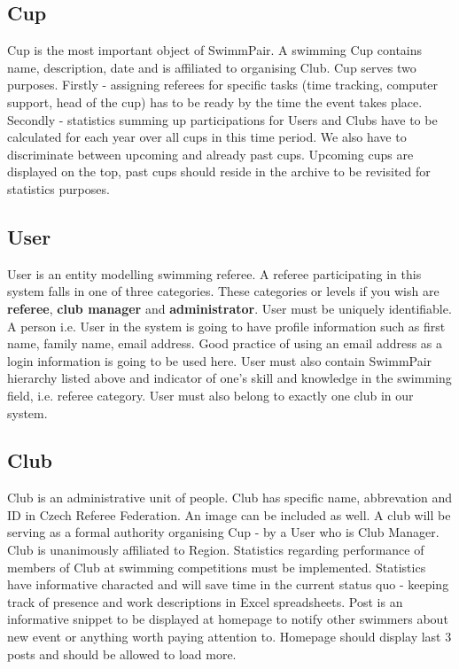 \subsection*{Cup}
Cup is the most important object of SwimmPair. A swimming Cup contains name, description, date and is affiliated to organising Club. Cup serves two purposes. Firstly - assigning referees for specific tasks (time tracking, computer support, head of the cup) has to be ready by the time the event takes place. Secondly - statistics summing up participations for Users and Clubs have to be calculated for each year over all cups in this time period. We also have to discriminate between upcoming and already past cups. Upcoming cups are displayed on the top, past cups should reside in the archive to be revisited for statistics purposes.
\subsection*{User}
\par
User is an entity modelling swimming referee. A referee participating in this system falls in one of three categories. These categories or levels if you wish are \textbf{referee}, \textbf{club manager} and \textbf{administrator}. User must be uniquely identifiable. A person i.e. User in the system is going to have profile information such as first name, family name, email address. Good practice of using an email address as a login information is going to be used here. User must also contain SwimmPair hierarchy listed above and indicator of one's skill and knowledge in the swimming field, i.e. referee category. User must also belong to exactly one club in our system.
\subsection*{Club}
\par
Club is an administrative unit of people. Club has specific name, abbrevation and ID in Czech Referee Federation. An image can be included as well. A club will be serving as a formal authority organising Cup - by a User who is Club Manager. Club is unanimously affiliated to Region. Statistics regarding performance of members of Club at swimming competitions must be implemented. Statistics have informative characted and will save time in the current status quo - keeping track of presence and work descriptions in Excel spreadsheets. 
Post is an informative snippet to be displayed at homepage to notify other swimmers about new event or anything worth paying attention to. Homepage should display last 3 posts and should be allowed to load more.
